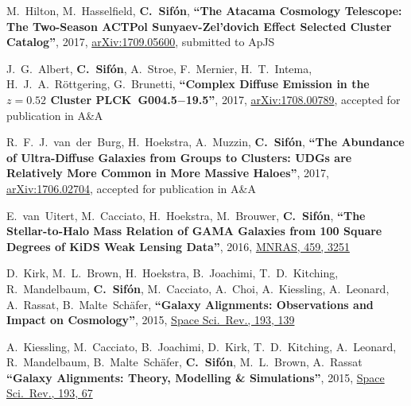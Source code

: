 \documentclass{article}
\def\myself{\textbf{\color{red} C.~Sif\'on}}
\def\aap{A\&A}
\def\apjs{ApJS}
\def\mnras{MNRAS}
\def\ssr{Space Sci.\ Rev.}
\newcommand{\accepted}[1]{accepted for publication in #1}
\newcommand{\submitted}[1]{submitted to #1}
\newcommand{\paper}[1]{\textbf{``#1''}}
\begin{document}
\vspace{-0.5cm}
\begin{etaremune}

\item
M.~Hilton, M.~Hasselfield, \myself, 
\paper{The Atacama Cosmology Telescope: The Two-Season ACTPol Sunyaev-Zel'dovich 
Effect Selected Cluster Catalog},
2017, \href{http://adsabs.harvard.edu/abs/2017arXiv170905600H}{arXiv:1709.05600},
\submitted{\apjs}

\item
J.~G.~Albert, \myself, A.~Stroe, F.~Mernier, H.~T.~Intema, H.~J.~A.~R\"ottgering, 
G.~Brunetti,
\paper{Complex Diffuse Emission in the $z=0.52$ Cluster PLCK~G004.5$-$19.5},
2017, \href{http://adsabs.harvard.edu/abs/2017arXiv170800789A}{arXiv:1708.00789}, 
\accepted{\aap}

\item
R.~F.~J.~van~der~Burg, H.~Hoekstra, A.~Muzzin, \myself, 
\paper{The Abundance of Ultra-Diffuse Galaxies from Groups to Clusters: UDGs 
are Relatively More Common in More Massive Haloes},
2017, \href{http://adsabs.harvard.edu/abs/2017arXiv170602704V}{arXiv:1706.02704},
\accepted{\aap}

\item
E.~van~Uitert, M.~Cacciato, H.~Hoekstra, M.~Brouwer, \myself, 
\paper{The Stellar-to-Halo Mass Relation of GAMA Galaxies from 100 Square Degrees of KiDS Weak Lensing Data},
2016, \href{http://adsabs.harvard.edu/abs/2016MNRAS.459.3251V}{\mnras, 459, 3251}

\item
D.~Kirk, M.~L.~Brown, H.~Hoekstra, B.~Joachimi, T.~D.~Kitching, R.~Mandelbaum, \myself, 
M.~Cacciato, A.~Choi, A.~Kiessling, A.~Leonard, A.~Rassat, B.~Malte~Sch\"afer,
\paper{Galaxy Alignments: Observations and Impact on Cosmology},
2015, \href{http://adsabs.harvard.edu/doi/10.1007/s11214-015-0213-4}{\ssr, 193, 139}

\item
A.~Kiessling, M.~Cacciato, B.~Joachimi, D.~Kirk, T.~D.~Kitching, A.~Leonard, R.~Mandelbaum, 
B.~Malte~Sch\"afer, \myself, M.~L.~Brown, A.~Rassat
\paper{Galaxy Alignments: Theory, Modelling \& Simulations},
2015, \href{http://adsabs.harvard.edu/doi/10.1007/s11214-015-0203-6}{\ssr, 193, 67}


\end{etaremune}
\end{document}
